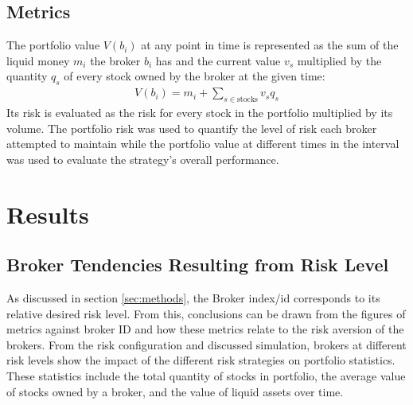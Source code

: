 \documentclass[letterpaper, 11 pt, proceedings]{IEEEtran}
\begin{document}
	\subsection{Metrics}\label{subsec:metrics}	
	The portfolio value $V(b_i)$ at any point in time is represented as the sum of the liquid money $m_i$ the broker $b_i$ has and the current value $v_s$ multiplied by the quantity $q_s$ of every stock owned by the broker at the given time: 
	\begin{align}
		V(b_i) = m_i + \sum\limits_{s\in\text{stocks}} v_s q_s\label{eq:portfolio_value}
	\end{align}
	Its risk is evaluated as the risk for every stock in the portfolio multiplied by its volume. The portfolio risk was used to quantify the level of risk each broker attempted to maintain while the portfolio value at different times in the interval was used to evaluate the strategy's overall performance.


	\section{Results}\label{sec:results}
		
	
	\subsection{Broker Tendencies Resulting from Risk Level}\label{subsec:tendencies}	
	As discussed in section \ref{sec:methods}, the Broker index/id corresponds to its relative desired risk level. From this, conclusions can be drawn from the figures of metrics against broker ID and how these metrics relate to the risk aversion of the brokers. From the risk configuration and discussed simulation, brokers at different risk levels show the impact of the different risk strategies on portfolio statistics. These statistics include the total quantity of stocks in portfolio, the average value of stocks owned by a broker, and the value of liquid assets over time.
	
\end{document}
